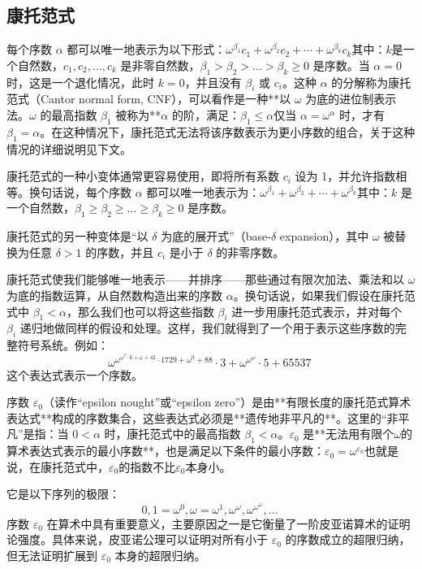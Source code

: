 \subsection{康托范式} 
每个序数 \(\alpha\) 都可以唯一地表示为以下形式：\(\omega^{\beta_1} c_1 + \omega^{\beta_2} c_2 + \cdots + \omega^{\beta_k} c_k\)其中：\(k\)是一个自然数，\(c_1, c_2, \dots, c_k\) 是非零自然数，\(\beta_1 > \beta_2 > \dots > \beta_k \geq 0\) 是序数。当 \(\alpha = 0\) 时，这是一个退化情况，此时 \(k = 0\)，并且没有 \(\beta_i\) 或 \(c_i\)。这种 \(\alpha\) 的分解称为康托范式（Cantor normal form, CNF），可以看作是一种**以 \(\omega\) 为底的进位制表示法。\(\omega\) 的最高指数 \(\beta_1\) 被称为**\(\alpha\) 的阶，满足：\(\beta_1 \leq \alpha\)仅当 \(\alpha = \omega^\alpha\) 时，才有 \(\beta_1 = \alpha\)。在这种情况下，康托范式无法将该序数表示为更小序数的组合，关于这种情况的详细说明见下文。

康托范式的一种小变体通常更容易使用，即将所有系数 \(c_i\) 设为 1，并允许指数相等。换句话说，每个序数 \(\alpha\) 都可以唯一地表示为：\(\omega^{\beta_1} + \omega^{\beta_2} + \cdots + \omega^{\beta_k}\)其中：\(k\) 是一个自然数，\(\beta_1 \geq \beta_2 \geq \dots \geq \beta_k \geq 0\) 是序数。

康托范式的另一种变体是“以 \(\delta\) 为底的展开式”（base-\(\delta\) expansion），其中 \(\omega\) 被替换为任意 \(\delta > 1\) 的序数，并且 \(c_i\) 是小于 \(\delta\) 的非零序数。

康托范式使我们能够唯一地表示——并排序——那些通过有限次加法、乘法和以 \(\omega\) 为底的指数运算，从自然数构造出来的序数 \(\alpha\)。换句话说，如果我们假设在康托范式中 \(\beta_1 < \alpha\)，那么我们也可以将这些指数 \(\beta_i\) 进一步用康托范式表示，并对每个 \(\beta_i\) 递归地做同样的假设和处理。这样，我们就得到了一个用于表示这些序数的完整符号系统。例如：
\[
\omega^{\omega^{\omega^7 \cdot 6 + \omega + 42} \cdot 1729 + \omega^9 + 88} \cdot 3 + \omega^{\omega^{\omega}} \cdot 5 + 65537~
\]
这个表达式表示一个序数。

序数 \(\varepsilon_0\)（读作“epsilon nought”或“epsilon zero”）是由**有限长度的康托范式算术表达式**构成的序数集合，这些表达式必须是**遗传地非平凡的**。这里的“非平凡”是指：当 \(0 < \alpha\) 时，康托范式中的最高指数 \(\beta_1 < \alpha\)。\(\varepsilon_0\) 是**无法用有限个\(\omega\)的算术表达式表示的最小序数**，也是满足以下条件的最小序数：\(\varepsilon_0 = \omega^{\varepsilon_0}\)也就是说，在康托范式中，\(\varepsilon_0\)的指数不比\(\varepsilon_0\)本身小。

它是以下序列的极限：
\[
0, 1 = \omega^0, \omega = \omega^1, \omega^\omega, \omega^{\omega^\omega}, \dots~
\]
序数 \(\varepsilon_0\) 在算术中具有重要意义，主要原因之一是它衡量了一阶皮亚诺算术的证明论强度。具体来说，皮亚诺公理可以证明对所有小于 \(\varepsilon_0\) 的序数成立的超限归纳，但无法证明扩展到 \(\varepsilon_0\) 本身的超限归纳。

